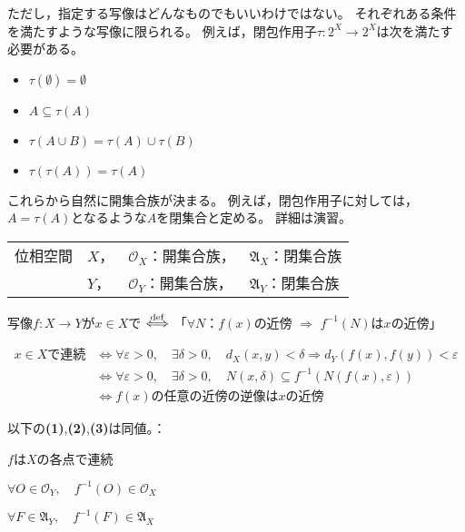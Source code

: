 \documentclass[uplatex]{jsarticle}
\begin{document}
ただし，指定する写像はどんなものでもいいわけではない。
それぞれある条件を満たすような写像に限られる。
例えば，閉包作用子$\tau \colon 2^{X} \longrightarrow 2^{X}$は次を満たす必要がある。
\begin{itemize}
  \vspace{-0.5\baselineskip}
  \item $\tau (\emptyset) = \emptyset$
  \item $A \subseteq \tau(A)$
  \item $\tau (A \cup B) = \tau (A) \cup \tau (B)$
  \item $\tau (\tau (A)) = \tau (A)$
  \vspace{-0.5\baselineskip}
\end{itemize}

これらから自然に開集合族が決まる。
例えば，閉包作用子に対しては，$A = \tau (A)$となるような$A$を閉集合と定める。
詳細は演習。

\sukima {}

\renewcommand{\arraystretch}{1}
\begin{tabular}{ll@{\,}l@{\,}l}
  位相空間 & $X$， & $\mathcal{O}_{X}$：開集合族， & $\mathfrak{A}_{X}$：閉集合族 \\
          & $Y$， & $\mathcal{O}_{Y}$：開集合族， & $\mathfrak{A}_{Y}$：閉集合族
\end{tabular}
\renewcommand{\arraystretch}{1.3}

\begin{teigi}[連続性]
  写像$f \colon X \longrightarrow Y$が$x \in X$で $\overset{\mathrm{def}}{\Longleftrightarrow}$ 
  「$\forall N$：$f(x)$の近傍 $\Longrightarrow$ $f^{-1}(N)$は$x$の近傍」
\end{teigi}

\begin{align*}
  x \in X \text{で連続} & \Longleftrightarrow \forall \varepsilon > 0, \quad \exists \delta > 0, \quad d_{X} (x,y) < \delta \Longrightarrow d_{Y}(f(x), f(y)) < \varepsilon \\
  & \Longleftrightarrow \forall \varepsilon > 0, \quad \exists \delta > 0, \quad N(x,\delta) \subseteq f^{-1} (N(f(x), \varepsilon)) \\
  & \Longleftrightarrow f(x) \text{の任意の近傍の逆像は} x \text{の近傍}
\end{align*}

\begin{teiri}
  \label{isou.renzoku}
  以下の{\bf (1)},{\bf (2)},{\bf (3)}は同値。：
  
   $f$は$X$の各点で連続

   $\forall O \in \mathcal{O}_{Y}, \quad f^{-1}(O) \in \mathcal{O}_{X}$

   $\forall F \in \mathfrak{A}_{Y}, \quad f^{-1}(F) \in \mathfrak{A}_{X}$
\end{teiri}
\end{document}
